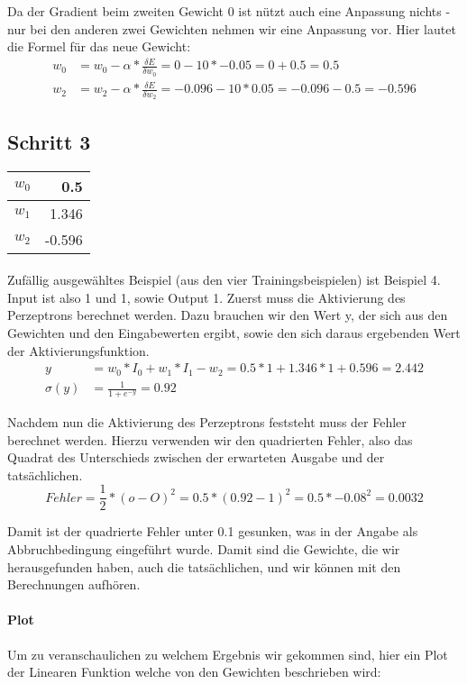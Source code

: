 \documentclass[a4paper]{article}
\begin{document}
Da der Gradient beim zweiten Gewicht 0 ist nützt auch eine Anpassung nichts - nur bei den anderen zwei Gewichten nehmen wir eine Anpassung vor. Hier lautet die Formel für das neue Gewicht:
\begin{align*}
	w_0 &= w_0 - \alpha * \frac{\delta E}{\delta w_0} = 0 - 10 * -0.05 = 0 + 0.5 = 0.5 \\
	w_2 &= w_2 - \alpha * \frac{\delta E}{\delta w_2} = -0.096 - 10 * 0.05 = -0.096 - 0.5 = -0.596
\end{align*}

\subsection{Schritt 3}
\begin{tabular}{|l|r|}
	\hline
	$w_0$ & 0.5 \\\hline
	$w_1$ & 1.346 \\\hline
	$w_2$ & -0.596 \\\hline
\end{tabular}
\paragraph{}
Zufällig ausgewähltes Beispiel (aus den vier Trainingsbeispielen) ist Beispiel 4. Input ist also 1 und 1, sowie Output 1.
Zuerst muss die Aktivierung des Perzeptrons berechnet werden. Dazu brauchen wir den Wert y, der sich aus den Gewichten und den Eingabewerten ergibt, sowie den sich daraus ergebenden Wert der Aktivierungsfunktion.
\begin{align*}
	y &= w_0 * I_0 + w_1 * I_1 - w_2 = 0.5 * 1 + 1.346 * 1 + 0.596 = 2.442 \\
	\sigma(y) &= \frac{1}{1 + e^{-y}} = 0.92
\end{align*}

Nachdem nun die Aktivierung des Perzeptrons feststeht muss der Fehler berechnet werden. Hierzu verwenden wir den quadrierten Fehler, also das Quadrat des Unterschieds zwischen der erwarteten Ausgabe und der tatsächlichen.
\[
	Fehler = \frac{1}{2} * (o - O)^2 = 0.5 * (0.92 - 1)^2 = 0.5 * -0.08^2 = 0.0032
\]

Damit ist der quadrierte Fehler unter 0.1 gesunken, was in der Angabe als Abbruchbedingung eingeführt wurde. Damit sind die Gewichte, die wir herausgefunden haben, auch die tatsächlichen, und wir können mit den Berechnungen aufhören.

\paragraph{Plot}
Um zu veranschaulichen zu welchem Ergebnis wir gekommen sind, hier ein Plot der Linearen Funktion welche von den Gewichten beschrieben wird:
\end{document}
